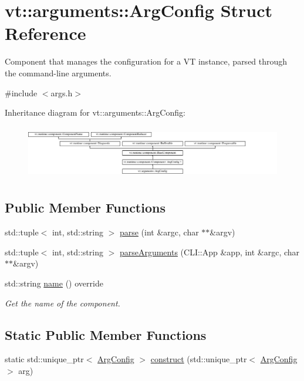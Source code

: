 \hypertarget{structvt_1_1arguments_1_1_arg_config}{}\section{vt\+:\+:arguments\+:\+:Arg\+Config Struct Reference}
\label{structvt_1_1arguments_1_1_arg_config}


Component that manages the configuration for a VT instance, parsed through the command-\/line arguments.  




{\ttfamily \#include $<$args.\+h$>$}

Inheritance diagram for vt\+:\+:arguments\+:\+:Arg\+Config\+:\begin{figure}[H]
\begin{center}
\leavevmode
\includegraphics[height=2.372881cm]{structvt_1_1arguments_1_1_arg_config}
\end{center}
\end{figure}
\subsection*{Public Member Functions}
\begin{DoxyCompactItemize}
\item 
std\+::tuple$<$ int, std\+::string $>$ \hyperlink{structvt_1_1arguments_1_1_arg_config_a124125d908a910cf52c6c59a3f0f2713}{parse} (int \&argc, char $\ast$$\ast$\&argv)
\item 
std\+::tuple$<$ int, std\+::string $>$ \hyperlink{structvt_1_1arguments_1_1_arg_config_ac6711ab96113f032b9e0a0b12d24eda3}{parse\+Arguments} (C\+L\+I\+::\+App \&app, int \&argc, char $\ast$$\ast$\&argv)
\item 
std\+::string \hyperlink{structvt_1_1arguments_1_1_arg_config_ade5e5994235f0953970fc3f460f9167a}{name} () override
\begin{DoxyCompactList}\small\item\em Get the name of the component. \end{DoxyCompactList}\end{DoxyCompactItemize}
\subsection*{Static Public Member Functions}
\begin{DoxyCompactItemize}
\item 
static std\+::unique\+\_\+ptr$<$ \hyperlink{structvt_1_1arguments_1_1_arg_config}{Arg\+Config} $>$ \hyperlink{structvt_1_1arguments_1_1_arg_config_a2248f3913b93ca336fdac5c2ec9c6e0b}{construct} (std\+::unique\+\_\+ptr$<$ \hyperlink{structvt_1_1arguments_1_1_arg_config}{Arg\+Config} $>$ arg)
\end{DoxyCompactItemize}

